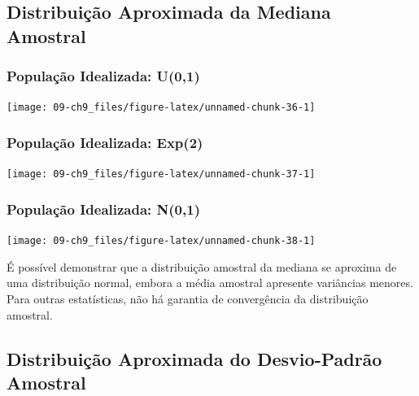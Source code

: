 \documentclass[
]{book}
\theoremstyle{definition}
\theoremstyle{definition}
\theoremstyle{definition}
\theoremstyle{remark}
\begin{document}
\hypertarget{distribuiuxe7uxe3o-aproximada-da-mediana-amostral}{%
\subsection*{Distribuição Aproximada da Mediana Amostral}\label{distribuiuxe7uxe3o-aproximada-da-mediana-amostral}}

\hypertarget{populauxe7uxe3o-idealizada-u01}{%
\subsubsection*{População Idealizada: U(0,1)}\label{populauxe7uxe3o-idealizada-u01}}

\texttt{[image: 09-ch9\_files/figure-latex/unnamed-chunk-36-1]}

\hypertarget{populauxe7uxe3o-idealizada-exp2}{%
\subsubsection*{População Idealizada: Exp(2)}\label{populauxe7uxe3o-idealizada-exp2}}

\texttt{[image: 09-ch9\_files/figure-latex/unnamed-chunk-37-1]}

\hypertarget{populauxe7uxe3o-idealizada-n01}{%
\subsubsection*{População Idealizada: N(0,1)}\label{populauxe7uxe3o-idealizada-n01}}

\texttt{[image: 09-ch9\_files/figure-latex/unnamed-chunk-38-1]}

É possível demonstrar que a distribuição amostral da mediana se aproxima de uma distribuição normal, embora a média amostral apresente variâncias menores. Para outras estatísticas, não há garantia de convergência da distribuição amostral.

\hypertarget{distribuiuxe7uxe3o-aproximada-do-desvio-padruxe3o-amostral}{%
\subsection*{Distribuição Aproximada do Desvio-Padrão Amostral}\label{distribuiuxe7uxe3o-aproximada-do-desvio-padruxe3o-amostral}}
\end{document}
